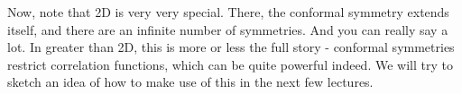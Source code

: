 Now, note that 2D is very very special. There, the conformal symmetry extends itself, and there are an infinite number of symmetries. And you can really say a lot. In greater than 2D, this is more or less the full story - conformal symmetries restrict correlation functions, which can be quite powerful indeed. We will try to sketch an idea of how to make use of this in the next few lectures.